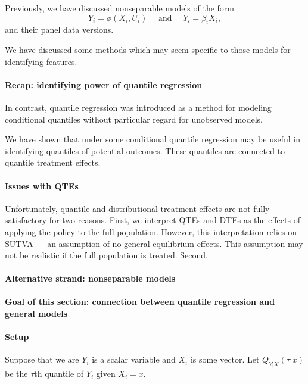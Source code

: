  
  Previously, we have discussed nonseparable models of the form 
 \begin{equation}
 	Y_i = \phi(X_i, U_i) \quad \text{ and } \quad  Y_i = \beta_i X_i,
 \end{equation}
 and their panel data versions. 
 
 We have discussed some methods which may seem specific to those models for identifying features.
 
 \paragraph{Recap: identifying power of quantile regression}
 
 In contrast, quantile regression was introduced as a method for modeling conditional quantiles without particular regard for unobserved models.
 
 We have shown that under some conditional quantile regression may be useful in identifying quantiles of potential outcomes. These quantiles are connected to quantile treatment effects.
 
 \paragraph{Issues with QTEs}
 
 Unfortunately, quantile and distributional treatment effects are not fully satisfactory for two reasons. First, we interpret QTEs and DTEs as the effects of applying the policy to the full population. However, this interpretation relies on SUTVA --- an assumption of no general equilibrium effects. This assumption may not be realistic if the full population is treated. Second, 
 
\paragraph{Alternative strand: nonseparable models} 
   
 \paragraph{Goal of this section: connection between quantile regression and general models}
 
 \paragraph{Setup}
 
 
 Suppose that we are $Y_i$ is a scalar variable and $X_i$ is some vector. Let $Q_{Y|X}(\tau|x)$ be the $\tau$th quantile of $Y_i$ given $X_i=x$.
 
